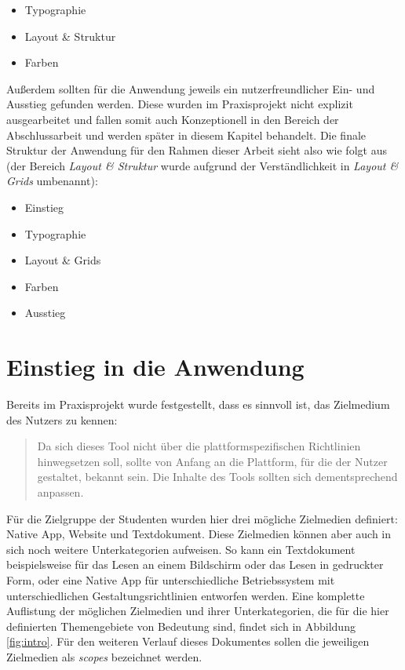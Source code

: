 \begin{itemize}
  \item Typographie
  \item Layout \& Struktur
  \item Farben
\end{itemize}

Außerdem sollten für die Anwendung jeweils ein nutzerfreundlicher Ein- und Ausstieg gefunden werden. Diese wurden im Praxisprojekt nicht explizit ausgearbeitet und fallen somit auch Konzeptionell in den Bereich der Abschlussarbeit und werden später in diesem Kapitel behandelt.
Die finale Struktur der Anwendung für den Rahmen dieser Arbeit sieht also wie folgt aus (der Bereich \textit{Layout \& Struktur} wurde aufgrund der Verständlichkeit in \textit{Layout \& Grids} umbenannt):

\begin{itemize}
  \item Einstieg
  \item Typographie
  \item Layout \& Grids
  \item Farben
  \item Ausstieg
\end{itemize}

\section{Einstieg in die Anwendung}
\label{chap:einstieg}
Bereits im Praxisprojekt wurde festgestellt, dass es sinnvoll ist, das Zielmedium des Nutzers zu kennen:

\begin{quote}
  Da sich dieses Tool nicht über die plattformspezifischen Richtlinien hinwegsetzen soll, sollte
von Anfang an die Plattform, für die der Nutzer gestaltet, bekannt sein. Die Inhalte des Tools
sollten sich dementsprechend anpassen. \cite{PoplawskiPP}
\end{quote}

Für die Zielgruppe der Studenten wurden hier drei mögliche Zielmedien definiert: Native App, Website und Textdokument. Diese Zielmedien können aber auch in sich noch weitere Unterkategorien aufweisen. So kann ein Textdokument beispielsweise für das Lesen an einem Bildschirm oder das Lesen in gedruckter Form, oder eine Native App für unterschiedliche Betriebssystem mit unterschiedlichen Gestaltungsrichtlinien entworfen werden. Eine komplette Auflistung der möglichen Zielmedien und ihrer Unterkategorien, die für die hier definierten Themengebiete von Bedeutung sind, findet sich in Abbildung \ref{fig:intro}.
Für den weiteren Verlauf dieses Dokumentes sollen die jeweiligen Zielmedien als \textit{scopes} bezeichnet werden.

